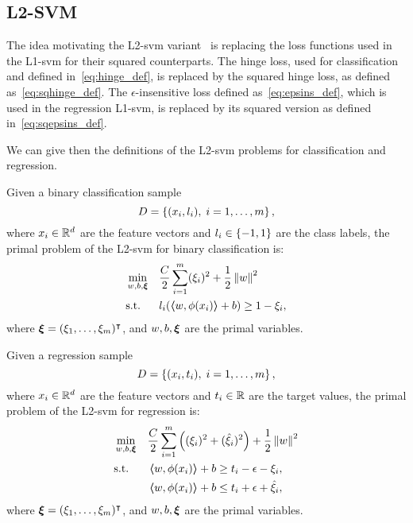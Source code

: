 \subsection{L2-SVM}
The idea motivating the L2-\acrshort{svm} variant~\citep{Burges98} is replacing the loss functions used in the L1-\acrshort{svm} for their squared counterparts. 
The hinge loss, used for classification and defined in~\eqref{eq:hinge_def}, is replaced by the squared hinge loss, as defined as~\eqref{eq:sqhinge_def}.
The $\epsilon$-insensitive loss defined as~\eqref{eq:epsins_def}, which is used in the regression L1-\acrshort{svm}, is replaced by its squared version as defined in~\eqref{eq:sqepsins_def}.
%

We can give then the definitions of the L2-\acrshort{svm} problems for classification and regression.
\begin{definition}
    Given a binary classification sample
    $$ D = \left\{(x_i, l_i), \; i=1, \ldots, m\right\} ,$$
    where $x_i \in \mathbb{R}^d$ are the feature vectors and $l_i \in \left\{-1, 1\right\}$ are the class labels, 
    the primal problem of the L2-\acrshort{svm} for binary classification is:
    \begin{equation}
        \label{eq:l2_primal_clas}
        \begin{aligned}
            &\min_{w, b, \fv{\xi}} & & \frac{C}{2} \sum_{i=1}^m (\xi_i)^2 + \frac{1}{2} \norm{w}^2 \\
            & \text{s.t.} & & l_i (\dotp{w}{\phi(x_i)} + b) \geq 1 - \xi_i , 
        \end{aligned}  
    \end{equation}
    where $\bm{\xi} = (\xi_1, \ldots, \xi_m)^\intercal$, and $w, b, \bm{\xi}$ are the primal variables.
\end{definition}
%
\begin{definition}
    Given a regression sample
    $$ D = \left\{(x_i, t_i), \; i=1, \ldots, m\right\} ,$$
    where $x_i \in \mathbb{R}^d$ are the feature vectors and $t_i \in \mathbb{R}$ are the target values, 
    the primal problem of the L2-\acrshort{svm} for regression is:
    \begin{equation}
        \label{eq:l2_primal_reg}
        \begin{aligned}
            &\min_{w, b, \fv{\xi}} & & \frac{C}{2} \sum_{i=1}^m \left((\xi_i)^2 + (\hat{\xi}_i)^2 \right) + \frac{1}{2} \norm{w}^2 \\
            & \text{s.t.} & & \dotp{w}{\phi(x_i)} + b \geq t_i - \epsilon - \xi_i  , \\
            & & & \dotp{w}{\phi(x_i)} + b \leq t_i + \epsilon + \hat{\xi}_i , 
        \end{aligned}  
    \end{equation}
    where $\bm{\xi} = (\xi_1, \ldots, \xi_m)^\intercal$, and $w, b, \bm{\xi}$ are the primal variables.
\end{definition}
